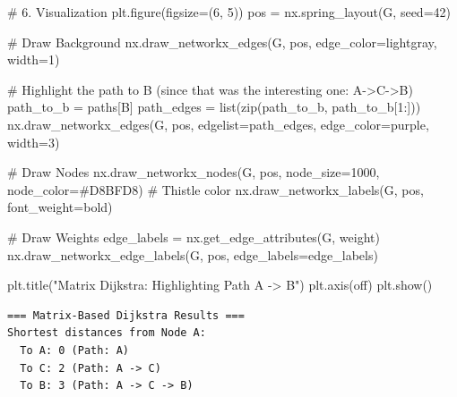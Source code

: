 \documentclass[
  letterpaper,
  DIV=11,
  numbers=noendperiod]{scrreprt}
\newenvironment{Shaded}{\begin{snugshade}}{\end{snugshade}}
\newcommand{\BuiltInTok}[1]{\textcolor[rgb]{0.00,0.23,0.31}{#1}}
\newcommand{\CommentTok}[1]{\textcolor[rgb]{0.37,0.37,0.37}{#1}}
\newcommand{\DecValTok}[1]{\textcolor[rgb]{0.68,0.00,0.00}{#1}}
\newcommand{\NormalTok}[1]{\textcolor[rgb]{0.00,0.23,0.31}{#1}}
\newcommand{\OperatorTok}[1]{\textcolor[rgb]{0.37,0.37,0.37}{#1}}
\newcommand{\StringTok}[1]{\textcolor[rgb]{0.13,0.47,0.30}{#1}}
\begin{document}
\begin{Shaded}
\begin{Highlighting}[]
\CommentTok{\# 6. Visualization}
\NormalTok{plt.figure(figsize}\OperatorTok{=}\NormalTok{(}\DecValTok{6}\NormalTok{, }\DecValTok{5}\NormalTok{))}
\NormalTok{pos }\OperatorTok{=}\NormalTok{ nx.spring\_layout(G, seed}\OperatorTok{=}\DecValTok{42}\NormalTok{)}

\CommentTok{\# Draw Background}
\NormalTok{nx.draw\_networkx\_edges(G, pos, edge\_color}\OperatorTok{=}\StringTok{\textquotesingle{}lightgray\textquotesingle{}}\NormalTok{, width}\OperatorTok{=}\DecValTok{1}\NormalTok{)}

\CommentTok{\# Highlight the path to B (since that was the interesting one: A{-}\textgreater{}C{-}\textgreater{}B)}
\NormalTok{path\_to\_b }\OperatorTok{=}\NormalTok{ paths[}\StringTok{\textquotesingle{}B\textquotesingle{}}\NormalTok{]}
\NormalTok{path\_edges }\OperatorTok{=} \BuiltInTok{list}\NormalTok{(}\BuiltInTok{zip}\NormalTok{(path\_to\_b, path\_to\_b[}\DecValTok{1}\NormalTok{:]))}
\NormalTok{nx.draw\_networkx\_edges(G, pos, edgelist}\OperatorTok{=}\NormalTok{path\_edges, edge\_color}\OperatorTok{=}\StringTok{\textquotesingle{}purple\textquotesingle{}}\NormalTok{, width}\OperatorTok{=}\DecValTok{3}\NormalTok{)}

\CommentTok{\# Draw Nodes}
\NormalTok{nx.draw\_networkx\_nodes(G, pos, node\_size}\OperatorTok{=}\DecValTok{1000}\NormalTok{, node\_color}\OperatorTok{=}\StringTok{\textquotesingle{}\#D8BFD8\textquotesingle{}}\NormalTok{) }\CommentTok{\# Thistle color}
\NormalTok{nx.draw\_networkx\_labels(G, pos, font\_weight}\OperatorTok{=}\StringTok{\textquotesingle{}bold\textquotesingle{}}\NormalTok{)}

\CommentTok{\# Draw Weights}
\NormalTok{edge\_labels }\OperatorTok{=}\NormalTok{ nx.get\_edge\_attributes(G, }\StringTok{\textquotesingle{}weight\textquotesingle{}}\NormalTok{)}
\NormalTok{nx.draw\_networkx\_edge\_labels(G, pos, edge\_labels}\OperatorTok{=}\NormalTok{edge\_labels)}

\NormalTok{plt.title(}\StringTok{"Matrix Dijkstra: Highlighting Path A {-}\textgreater{} B"}\NormalTok{)}
\NormalTok{plt.axis(}\StringTok{\textquotesingle{}off\textquotesingle{}}\NormalTok{)}
\NormalTok{plt.show()}
\end{Highlighting}
\end{Shaded}

\begin{verbatim}
=== Matrix-Based Dijkstra Results ===
Shortest distances from Node A:
  To A: 0 (Path: A)
  To C: 2 (Path: A -> C)
  To B: 3 (Path: A -> C -> B)
\end{verbatim}
\end{document}
